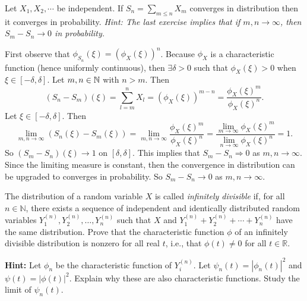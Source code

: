 \begin{problem}
	Let $ X_1,X_2,\cdots $ be independent. If $ S_n = \sum_{m\leq n}X_m $ converges in distribution then it converges in probability. \emph{Hint: The last exercise implies that if $ m,n \to \infty $, then $ S_m - S_n \to 0 $ in probability.}
\end{problem}
\begin{solution}
	First observe that $ \phi_{S_n}(\xi) = (\phi_X(\xi))^n $. Because $ \phi_{X} $ is a characteristic function (hence uniformly continuous), then $ \exists \delta>0 $ such that $ \phi_X(\xi) > 0 $ when $ \xi \in [-\delta, \delta] $. Let $ m,n\in \mathbb{N} $ with $ n > m $. Then
	\[ (S_n - S_m)(\xi) = \sum_{l=m}^{n}X_l = (\phi_X(\xi))^{m-n} = \frac{\phi_X(\xi)^m}{\phi_X(\xi)^n}. \] 
	Let $ \xi \in [-\delta, \delta] $. Then
	\[ \lim_{m,n\to\infty}(S_n(\xi) - S_m(\xi)) =  \lim_{m,n\to\infty}\frac{\phi_X(\xi)^m}{\phi_X(\xi)^n} = \frac{\lim_{m\to\infty}\phi_X(\xi)^m}{\lim_{n\to\infty}\phi_X(\xi)^n} = 1.  \]
	So $ (S_m - S_n)(\xi) \to 1 $ on $ [\delta, \delta] $. This implies that $ S_m - S_n \Rightarrow 0 $ as $ m,n\to\infty $. Since the limiting measure is constant, then the convergence in distribution can be upgraded to converges in probability. So $ S_m - S_n \to 0 $ as $ m,n \to \infty $.
\end{solution}

\begin{problem}
	The distribution of a random variable \( X \) is called \textit{infinitely divisible} if, for all \( n \in \mathbb{N} \), there exists a sequence of independent and identically distributed random variables \( Y_1^{(n)}, Y_2^{(n)}, \ldots, Y_n^{(n)} \) such that \( X \) and \( Y_1^{(n)} + Y_2^{(n)} + \cdots + Y_n^{(n)} \) have the same distribution. Prove that the characteristic function \( \phi \) of an infinitely divisible distribution is nonzero for all real \( t \), i.e., that \( \phi(t) \neq 0 \) for all \( t \in \mathbb{R} \).
	
	\smallskip
	\noindent
	\textbf{Hint:} Let \( \phi_n \) be the characteristic function of \( Y_i^{(n)} \). Let \( \psi_n(t) = |\phi_n(t)|^2 \) and \( \psi(t) = |\phi(t)|^2 \). Explain why these are also characteristic functions. Study the limit of \( \psi_n(t) \).
	
\end{problem}




